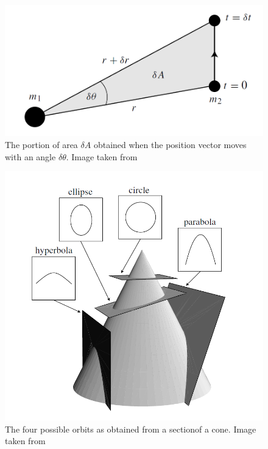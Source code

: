\documentclass[12pt,%
               a4paper,%
               oneside,openany,%
               titlepage,%
               headinclude,footinclude,%
               BCOR5mm,%
               cleardoublepage=empty,%
               tablecaptionabove,%
               floatperchapter,
               ]{scrreprt}                 %
\begin{document}
\begin{figure}[h]
\begin{center}
\includegraphics[width=1\textwidth]{Figures/Area_dynamics.png}
\caption{The portion of area $\delta A$ obtained when the position vector moves with an angle $\delta\theta$. Image taken from \cite{murray1999solar}}
\label{Area_dynamics}
\end{center}
\end{figure}

\begin{figure}[h]
\begin{center}
\includegraphics[width=1\textwidth]{Figures/Conics.png}
\caption{The four possible orbits as obtained from a sectionof a cone. Image taken from \cite{murray1999solar}}
\label{Conics}
\end{center}
\end{figure}
\end{document}
